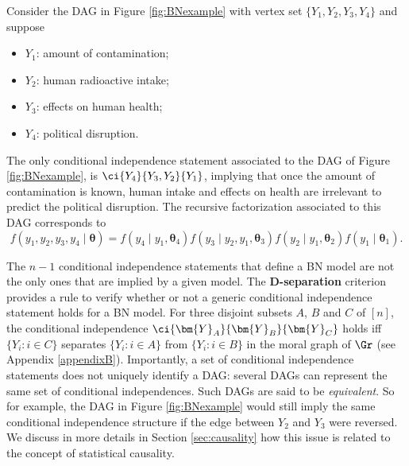 \begin{example}
\label{example:BN}
Consider the \gls{DAG} in Figure \ref{fig:BNexample} with vertex set  $\{Y_1, Y_2, Y_3, Y_4\}$ and suppose
\begin{multicols}{2}
\begin{itemize}
\item $Y_1$: amount of contamination;
\item $Y_2$: human radioactive intake;
\item $Y_3$: effects on human health;
\item $Y_4$: political disruption.
\end{itemize}
\end{multicols}
The only conditional independence statement associated to the \gls{DAG} of Figure \ref{fig:BNexample}, is $\ci{Y_4}{Y_3,Y_2}{Y_1}$, implying that once the amount of contamination is known, human intake and effects on health are irrelevant to predict the political disruption. The recursive factorization associated to this \gls{DAG} corresponds to 
\begin{equation*}
\label{eq:BNexample}
f(y_1,y_2,y_3,y_4\;|\;\bm{\theta})=f(y_4\;|\;y_1,\bm{\theta}_4)f(y_3\;|\; y_2,y_1, \bm{\theta}_3)f(y_2\;|\; y_1,\bm{\theta}_2)f(y_1\;|\;\bm{\theta}_1).
\end{equation*}
\end{example}

The $n-1$ conditional independence statements that define a \gls{BN} model are not the only ones that are implied by a given model. The \textbf{D-separation} criterion \citep{Lauritzen1996a} provides a rule to verify whether or not a generic conditional independence statement holds for a \gls{BN} model. For three disjoint subsets $A$, $B$ and $C$ of $[n]$, the conditional independence $\ci{\bm{Y}_A}{\bm{Y}_B}{\bm{Y}_C}$ holds iff $\{Y_i:i\in C\}$ separates $\{Y_i:i\in A\}$ from $\{Y_i:i\in B\}$ in the moral graph of $\Gr$ (see Appendix \ref{appendixB}). Importantly, a set of conditional independence statements does not uniquely identify a \gls{DAG}: several \glspl{DAG} can represent the same set of conditional independences. Such \glspl{DAG} are said to be \textit{equivalent}. So for example, the \gls{DAG} in Figure \ref{fig:BNexample} would still imply the same conditional independence structure if the edge between $Y_2$ and $Y_3$ were reversed. We discuss in more details in Section \ref{sec:causality} how this issue is related to the concept of statistical causality.

